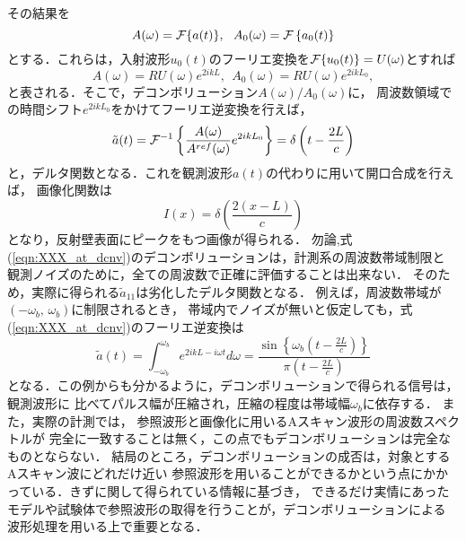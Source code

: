その結果を
\begin{equation}
	A(\omega)={\cal F}\{a(t)\}, \ \ 
	A_0(\omega)={\cal F}\left\{ a_0(t)\right\}
	\label{eqn:XXX_16}
\end{equation}
とする．これらは，入射波形$u_0(t)$のフーリエ変換を${\cal F}\{ u_0(t)\}=U(\omega)$とすれば
\begin{equation}
	A(\omega) = RU(\omega) e^{2ik L},  \ \
	A_0(\omega) = RU(\omega) e^{2ik L_0}, 
	\label{eqn:XXX_17}
\end{equation}
と表される．そこで，デコンボリューション$A(\omega)/A_0(\omega)$に，
周波数領域での時間シフト$e^{2ikL_0}$をかけてフーリエ逆変換を行えば，
\begin{equation}
	\tilde a(t)= {\cal F}^{-1} \left\{ 
	\frac{A(\omega)}{A^{ref}(\omega)} e ^{2ik L_0}
	\right\}
	=\delta \left(t-\frac{2L}{c}\right)
	\label{eqn:XXX_at_dcnv}
\end{equation}
と，デルタ関数となる．これを観測波形$a(t)$の代わりに用いて開口合成を行えば，
画像化関数は
\begin{equation}
	I(x)=\delta\left( \frac{2(x-L)}{c}\right)
	\label{eqn:XXX_}
\end{equation}
となり，反射壁表面にピークをもつ画像が得られる．
勿論,式(\ref{eqn:XXX_at_dcnv})のデコンボリューションは，計測系の周波数帯域制限と
観測ノイズのために，全ての周波数で正確に評価することは出来ない．
そのため，実際に得られる$\tilde a_{11}$は劣化したデルタ関数となる．
例えば，周波数帯域が$(-\omega_b,\, \omega_b)$に制限されるとき，
帯域内でノイズが無いと仮定しても，式(\ref{eqn:XXX_at_dcnv})のフーリエ逆変換は
\begin{equation}
	\tilde a(t)= 
	\int_{-\omega_b}^{\omega_b} 
	e^{2ikL-i\omega t} d\omega 
	=\frac{\sin\left\{ \omega_b \left( t-\frac{2L}{c}\right)\right\}}{\pi \left(t-\frac{2L}{c}\right)}
	\label{eqn:XXX_18}
\end{equation}
となる．この例からも分かるように，デコンボリューションで得られる信号は，観測波形に
比べてパルス幅が圧縮され，圧縮の程度は帯域幅$\omega_b$に依存する．
また，実際の計測では， 参照波形と画像化に用いるAスキャン波形の周波数スペクトルが
完全に一致することは無く，この点でもデコンボリューションは完全なものとならない．
結局のところ，デコンボリューションの成否は，対象とするAスキャン波にどれだけ近い
参照波形を用いることができるかという点にかかっている．きずに関して得られている情報に基づき，
できるだけ実情にあったモデルや試験体で参照波形の取得を行うことが，デコンボリューションによる
波形処理を用いる上で重要となる．
